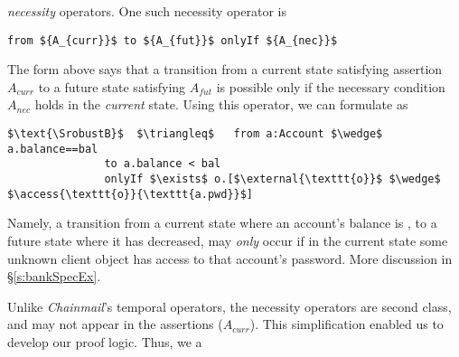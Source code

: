   \emph{necessity} operators. 
 One such necessity operator is
 
 \begin{lstlisting}[mathescape=true, language=chainmail, frame=lines]
                                from ${A_{curr}}$ to ${A_{fut}}$ onlyIf ${A_{nec}}$ 
\end{lstlisting}
The  form   {above} says that %
a  {transition} from a current state satisfying assertion $A_{curr}$ to a future
state satisfying $A_{fut}$ %
is possible only if the   necessary 
condition
$A_{nec}$ holds in the \emph{current} state.
Using %
this operator, we can formulate  \SrobustB %
as
\begin{lstlisting}[language = Chainmail, mathescape=true, frame=lines]
$\text{\SrobustB}$  $\triangleq$   from a:Account $\wedge$ a.balance==bal
               to a.balance < bal
               onlyIf $\exists$ o.[$\external{\texttt{o}}$ $\wedge$ $\access{\texttt{o}}{\texttt{a.pwd}}$]
\end{lstlisting}
Namely, a transition from a  {current} state where an account's balance is , to a  {future} state where 
it has decreased, may \emph{only} occur if  {in the current state} some unknown client object  
has access to that account's password. 
More discussion in \S\ref{s:bankSpecEx}. 

  
Unlike  \emph{Chainmail}'s temporal operators, 
 the necessity operators %
 are second class, and may not appear in the assertions  {(\eg  ${A_{curr}}$)}. 
 This simplification enabled us to develop our proof logic. 
 Thus, we  a 



